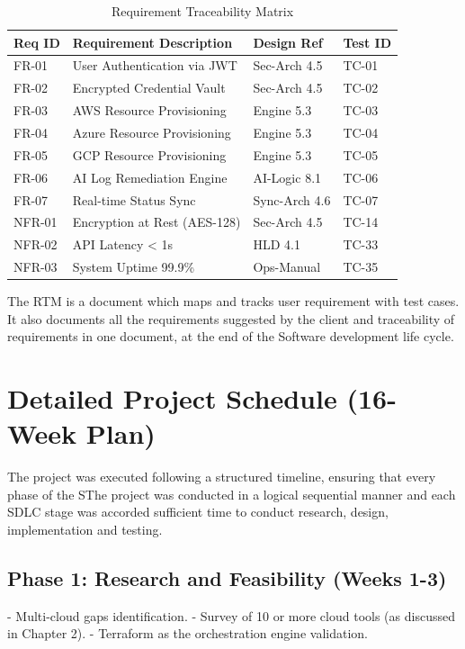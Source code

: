 \begin{table}
\centering
\caption{Requirement Traceability Matrix}
\label{tab:rtm}
\begin{tabular}{|p{1.5cm}|p{4.5cm}|p{3.5cm}|p{2cm}|}
\hline
\textbf{Req ID} & \textbf{Requirement Description} & \textbf{Design Ref} & \textbf{Test ID} \\ \hline
FR-01 & User Authentication via JWT & Sec-Arch 4.5 & TC-01 \\ \hline
FR-02 & Encrypted Credential Vault & Sec-Arch 4.5 & TC-02 \\ \hline
FR-03 & AWS Resource Provisioning & Engine 5.3 & TC-03 \\ \hline
FR-04 & Azure Resource Provisioning & Engine 5.3 & TC-04 \\ \hline
FR-05 & GCP Resource Provisioning & Engine 5.3 & TC-05 \\ \hline
FR-06 & AI Log Remediation Engine & AI-Logic 8.1 & TC-06 \\ \hline
FR-07 & Real-time Status Sync & Sync-Arch 4.6 & TC-07 \\ \hline
NFR-01 & Encryption at Rest (AES-128) & Sec-Arch 4.5 & TC-14 \\ \hline
NFR-02 & API Latency < 1s & HLD 4.1 & TC-33 \\ \hline
NFR-03 & System Uptime 99.9\% & Ops-Manual & TC-35 \\ \hline
\end{tabular}
\end{table}

The RTM is a document which maps and tracks user requirement with test cases. It also documents all the requirements suggested by the client and traceability of requirements in one document, at the end of the Software development life cycle. 

\section{Detailed Project Schedule (16-Week Plan)}
The project was executed following a structured timeline, ensuring that every phase of the SThe project was conducted in a logical sequential manner and each SDLC stage was accorded sufficient time to conduct research, design, implementation and testing.

\subsection{Phase 1: Research and Feasibility (Weeks 1-3)}
- Multi-cloud gaps identification.
- Survey of 10 or more cloud tools (as discussed in Chapter 2). 
- Terraform as the orchestration engine validation.


